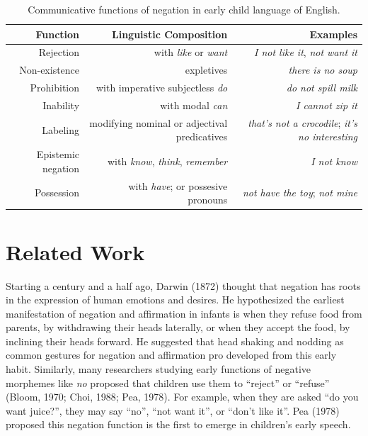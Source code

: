 \documentclass[
  english,
  man,floatsintext]{apa6}
\begin{document}
\begin{table}[h]
\small
\centering
\begin{tabular}{rrr}
  \hline
 \textbf{Function} & \textbf{Linguistic Composition} & \textbf{Examples} \\
  \hline
Rejection & with \textit{like} or \textit{want} & \textit{I not like it}, \textit{not want it}  \\
Non-existence & expletives & \textit{there is no soup} \\
Prohibition & with imperative subjectless \textit{do} & \textit{do not spill milk} \\
Inability & with modal \textit{can} & \textit{I cannot zip it} \\
Labeling & modifying nominal or adjectival predicatives & \textit{that's not a crocodile}; \textit{it's no interesting} \\
Epistemic negation & with \textit{know}, \textit{think}, \textit{remember}  & \textit{I not know} \\
Possession & with \textit{have}; or possesive pronouns & \textit{not have the toy}; \textit{not mine} \\
   \hline
\end{tabular}
\caption{Communicative functions of negation in early child language of English.}
\end{table}

\hypertarget{related-work}{%
\section{Related Work}\label{related-work}}

Starting a century and a half ago, Darwin (1872) thought that negation has roots in the expression of human emotions and desires. He hypothesized the earliest manifestation of negation and affirmation in infants is when they refuse food from parents, by withdrawing their heads laterally, or when they accept the food, by inclining their heads forward. He suggested that head shaking and nodding as common gestures for negation and affirmation pro developed from this early habit. Similarly, many researchers studying early functions of negative morphemes like \emph{no} proposed that children use them to \enquote{reject} or \enquote{refuse} (Bloom, 1970; Choi, 1988; Pea, 1978). For example, when they are asked \enquote{do you want juice?}, they may say \enquote{no}, \enquote{not want it}, or \enquote{don't like it}. Pea (1978) proposed this negation function is the first to emerge in children's early speech.
\end{document}
